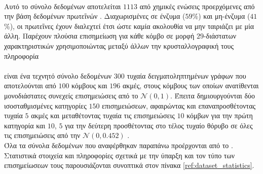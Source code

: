 \paragraph*{} Αυτό το σύνολο δεδομένων αποτελείται $1113$ από χημικές ενώσεις προερχόμενες από την βάση δεδομένων πρωτεΐνών .
Διαχωρισμένες σε ένζυμα ($59$\%) και μη-ένζυμα ($41$\%), οι πρωτεΐνες έχουν διαλεχτεί έτσι ώστε καμία ακολουθία να μην ταιριάζει με μία άλλη.
Παρέχουν πλούσια επισημείωση για κάθε κόμβο σε μορφή $29$-διάστατων χαρακτηριστικών χρησιμοποιώντας μεταξύ άλλων την κρυσταλλογραφική τους πληροφορία \cite{DobsonDoig03, borgwardt2005protein, Neumann2016}

\paragraph*{} είναι ένα τεχνητό σύνολο δεδομένων $300$ τυχαία δειγματοληπτημένων γράφων που αποτελούνται από $100$ κόμβους και $196$ ακμές, στους κόμβους των οποίων ανατίθενται μονοδιάστατες συνεχείς επισημειώσεις από το $\mathcal{N}(0, 1)$.
Έπειτα δημιουργούνται δύο ισοσταθμισμένες κατηγορίες $150$ επισημειώσεων, αφαιρώντας και επαναπροσθέτοντας τυχαία $5$ ακμές και μεταθέτοντας τυχαία τις επισημειώσεις $10$ κόμβων για την πρώτη κατηγορία και $10$, $5$ για την δεύτερη προσθέτοντας στο τέλος τυχαίο θόρυβο σε όλες τις επισημειώσεις από την $\mathcal{N}(0, 0.452)$ \cite{Feragen13}.
\newline \\
Όλα τα σύνολα δεδομένων που αναφέρθηκαν παραπάνω προέρχονται από το \cite{KKMMN2016}. Στατιστικά στοιχεία και πληροφορίες σχετικά με την ύπαρξη και τον τύπο των επισημείωσεων τους παρουσιάζονται συνοπτικά στον πίνακα \ref{ref:dataset_statistics}.

